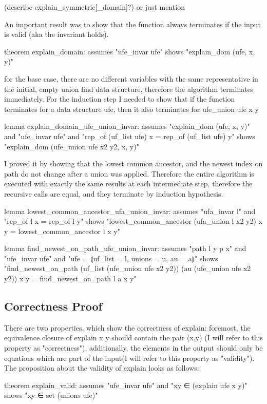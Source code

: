 (describe explain_symmetric[_domain]?)
or just mention

An important result was to show that the function always terminates if the input is valid (aka the invariant holds).

theorem explain_domain:
assumes "ufe_invar ufe"
shows "explain_dom (ufe, x, y)"

for the base case, there are no different variables with the same representative in the initial, empty union find data structure, therefore the algorithm terminates immediately. 
For the induction step I needed to show that if the function terminates for a data structure ufe, then it also terminates for ufe_union ufe x y

lemma explain_domain_ufe_union_invar:
assumes "explain_dom (ufe, x, y)"
and "ufe_invar ufe"
and "rep_of (uf_list ufe) x = rep_of (uf_list ufe) y"
shows "explain_dom (ufe_union ufe x2 y2, x, y)"

I proved it by showing that the lowest common ancestor, and the newest index on path do not change after a union was applied. Therefore the entire algorithm is executed with exactly the same results at each intermediate step, therefore the recursive calls are equal, and they terminate by induction hypothesis.

lemma lowest_common_ancestor_ufa_union_invar:
assumes "ufa_invar l" and "rep_of l x = rep_of l y"
shows "lowest_common_ancestor (ufa_union l x2 y2) x y = lowest_common_ancestor l x y"

lemma find_newest_on_path_ufe_union_invar:
assumes "path l y p x" 
and "ufe_invar ufe" and "ufe = ⦇uf_list = l, unions = u, au = a⦈"
shows "find_newest_on_path (uf_list (ufe_union ufe x2 y2)) (au (ufe_union ufe x2 y2)) x y = find_newest_on_path l a x y"

\subsection{Correctness Proof}



There are two properties, which show the correctness of explain: foremost, the equivalence closure of explain x y should contain the pair (x,y) (I will refer to this property as "correctness"), additionally, the elements in the output should only be equations which are part of the input(I will refer to this property as "validity"). The proposition about the validity of explain looks as follows:

theorem explain_valid:
assumes "ufe_invar ufe"
and "xy ∈ (explain ufe x y)"
shows "xy ∈ set (unions ufe)"

